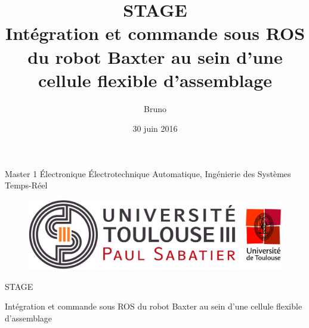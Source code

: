 \documentclass[a4paper,french, titlepage]{book}
\title{{\Huge STAGE}\\Intégration et commande sous ROS du robot Baxter au sein d'une cellule flexible d'assemblage\\}
\author{Bruno \bsc{Dato}}
\date{30 juin 2016}
\begin{document}
 
\thispagestyle{empty}

\begin{center}
Master 1 Électronique Électrotechnique Automatique, Ingénierie des Systèmes Temps-Réel  
\vspace{0.5cm}

\begin{figure}[H] 
\begin{center}
\includegraphics[scale=0.3]{Images/logo_ups.jpg} 
\end{center}
\end{figure}





\vspace{0.3cm}

{\Huge STAGE}\\

\vspace{0.3cm}

{\Huge Intégration et commande sous ROS du robot Baxter au sein d'une cellule flexible d'assemblage}\\

\vspace{0.5cm}


\end{center}
\end{document}
